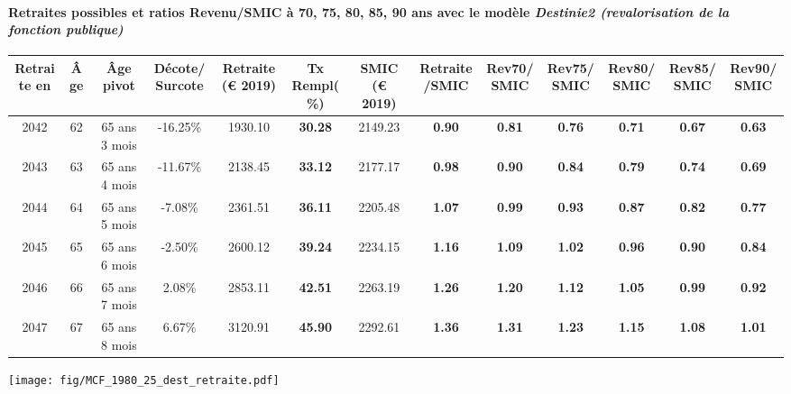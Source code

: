 \paragraph{Retraites possibles et ratios Revenu/SMIC à 70, 75, 80, 85, 90 ans avec le modèle \emph{Destinie2 (revalorisation de la fonction publique)}}  
 
{ \scriptsize \begin{center} 
\begin{tabular}[htb]{|c|c||c|c||c|c||c||c|c|c|c|c|c|} 
\hline 
 Retraite en &  Âge &  Âge pivot &  Décote/Surcote &  Retraite (\euro{} 2019) &  Tx Rempl(\%) &  SMIC (\euro{} 2019) &  Retraite/SMIC &  Rev70/SMIC &  Rev75/SMIC &  Rev80/SMIC &  Rev85/SMIC &  Rev90/SMIC \\ 
\hline \hline 
 2042 &  62 &  65 ans 3 mois &  -16.25\% &  1930.10 &  {\bf 30.28} &  2149.23 &  {\bf {\color{red} 0.90}} &  {\bf {\color{red} 0.81}} &  {\bf {\color{red} 0.76}} &  {\bf {\color{red} 0.71}} &  {\bf {\color{red} 0.67}} &  {\bf {\color{red} 0.63}} \\ 
\hline 
 2043 &  63 &  65 ans 4 mois &  -11.67\% &  2138.45 &  {\bf 33.12} &  2177.17 &  {\bf {\color{red} 0.98}} &  {\bf {\color{red} 0.90}} &  {\bf {\color{red} 0.84}} &  {\bf {\color{red} 0.79}} &  {\bf {\color{red} 0.74}} &  {\bf {\color{red} 0.69}} \\ 
\hline 
 2044 &  64 &  65 ans 5 mois &  -7.08\% &  2361.51 &  {\bf 36.11} &  2205.48 &  {\bf 1.07} &  {\bf {\color{red} 0.99}} &  {\bf {\color{red} 0.93}} &  {\bf {\color{red} 0.87}} &  {\bf {\color{red} 0.82}} &  {\bf {\color{red} 0.77}} \\ 
\hline 
 2045 &  65 &  65 ans 6 mois &  -2.50\% &  2600.12 &  {\bf 39.24} &  2234.15 &  {\bf 1.16} &  {\bf 1.09} &  {\bf 1.02} &  {\bf {\color{red} 0.96}} &  {\bf {\color{red} 0.90}} &  {\bf {\color{red} 0.84}} \\ 
\hline 
 2046 &  66 &  65 ans 7 mois &  2.08\% &  2853.11 &  {\bf 42.51} &  2263.19 &  {\bf 1.26} &  {\bf 1.20} &  {\bf 1.12} &  {\bf 1.05} &  {\bf {\color{red} 0.99}} &  {\bf {\color{red} 0.92}} \\ 
\hline 
 2047 &  67 &  65 ans 8 mois &  6.67\% &  3120.91 &  {\bf 45.90} &  2292.61 &  {\bf 1.36} &  {\bf 1.31} &  {\bf 1.23} &  {\bf 1.15} &  {\bf 1.08} &  {\bf 1.01} \\ 
\hline 
\hline 
\end{tabular} 
\end{center} } 

 \begin{center}\texttt{[image: fig/MCF\_1980\_25\_dest\_retraite.pdf]}\end{center} \label{fig/MCF_1980_25_dest_retraite.pdf} 

